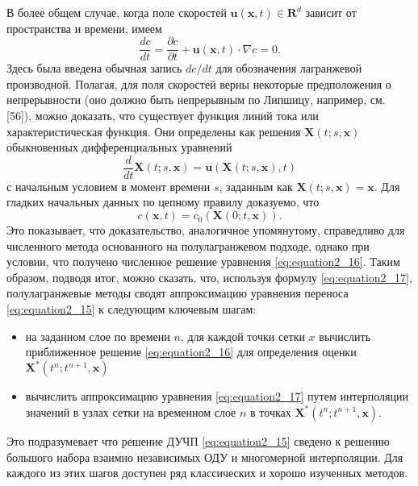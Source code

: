 В более общем случае, когда поле скоростей $\mathbf{u} (\mathbf{x},t)\in\mathbf{R}^d$ зависит от пространства и времени, имеем
%
\begin{equation}
\label{eq:equation2_15}
\frac{dc}{dt}=\frac{\partial{c}}{\partial{t}} + \mathbf{u}(\mathbf{x}, t) \cdot \nabla c = 0.
\end{equation}
%
Здесь была введена обычная запись $dc/dt$ для обозначения лагранжевой производной. Полагая, для поля скоростей верны некоторые предположения о непрерывности (оно должно быть непрерывным по Липшицу, например, см. [56]), можно доказать, что существует функция линий тока или характеристическая функция. Они определены как решения $\mathbf{X}(t;s, \mathbf{x})$ обыкновенных дифференциальных уравнений
%
\begin{equation}
\label{eq:equation2_16}
\frac{d}{dt}\mathbf{X}(t;s,\mathbf{x})=\mathbf{u}(\mathbf{X}(t; s, \mathbf{x}), t)
\end{equation}
%
с начальным условием в момент времени $s$, заданным как $\mathbf{X}(t;s,\mathbf{x})=\mathbf{x}$. Для гладких начальных данных по цепному правилу доказуемо, что
%
\begin{equation}
\label{eq:equation2_17}
c(\mathbf{x}, t) = c_0(\mathbf{X}(0;t,\mathbf{x})).
\end{equation}
%
Это показывает, что доказательство, аналогичное упомянутому, справедливо для численного метода основанного на полулагранжевом подходе, однако при условии, что получено численное решение уравнения \eqref{eq:equation2_16}. Таким образом, подводя итог, можно сказать, что, используя формулу \eqref{eq:equation2_17}, полулагранжевые методы сводят аппроксимацию уравнения переноса \eqref{eq:equation2_15} к следующим ключевым шагам:
\begin{itemize}
	\item на заданном слое по времени $n$, для каждой точки сетки $x$ вычислить приближенное решение \eqref{eq:equation2_16} для определения оценки $\mathbf{X}^*(t^n;t^{n+1}, \mathbf{x})$
	\item вычислить аппроксимацию уравнения \eqref{eq:equation2_17} путем интерполяции значений в узлах сетки на временном слое $n$ в точках $\mathbf{X}^*(t^n;t^{n+1}, \mathbf{x})$.
\end{itemize}
Это подразумевает что решение ДУЧП \eqref{eq:equation2_15} сведено к решению большого набора взаимно независимых ОДУ и многомерной интерполяции. Для каждого из этих шагов доступен ряд классических и хорошо изученных методов.
\newpage
